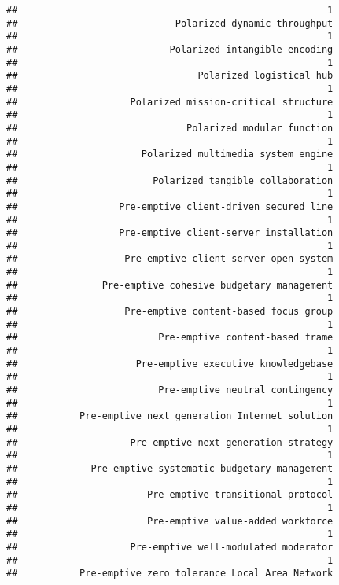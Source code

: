 \documentclass[
]{article}
\begin{document}
\begin{verbatim}
##                                                       1 
##                            Polarized dynamic throughput 
##                                                       1 
##                           Polarized intangible encoding 
##                                                       1 
##                                Polarized logistical hub 
##                                                       1 
##                    Polarized mission-critical structure 
##                                                       1 
##                              Polarized modular function 
##                                                       1 
##                      Polarized multimedia system engine 
##                                                       1 
##                        Polarized tangible collaboration 
##                                                       1 
##                  Pre-emptive client-driven secured line 
##                                                       1 
##                  Pre-emptive client-server installation 
##                                                       1 
##                   Pre-emptive client-server open system 
##                                                       1 
##               Pre-emptive cohesive budgetary management 
##                                                       1 
##                   Pre-emptive content-based focus group 
##                                                       1 
##                         Pre-emptive content-based frame 
##                                                       1 
##                     Pre-emptive executive knowledgebase 
##                                                       1 
##                         Pre-emptive neutral contingency 
##                                                       1 
##           Pre-emptive next generation Internet solution 
##                                                       1 
##                    Pre-emptive next generation strategy 
##                                                       1 
##             Pre-emptive systematic budgetary management 
##                                                       1 
##                       Pre-emptive transitional protocol 
##                                                       1 
##                       Pre-emptive value-added workforce 
##                                                       1 
##                    Pre-emptive well-modulated moderator 
##                                                       1 
##           Pre-emptive zero tolerance Local Area Network 

\end{verbatim}
\end{document}
